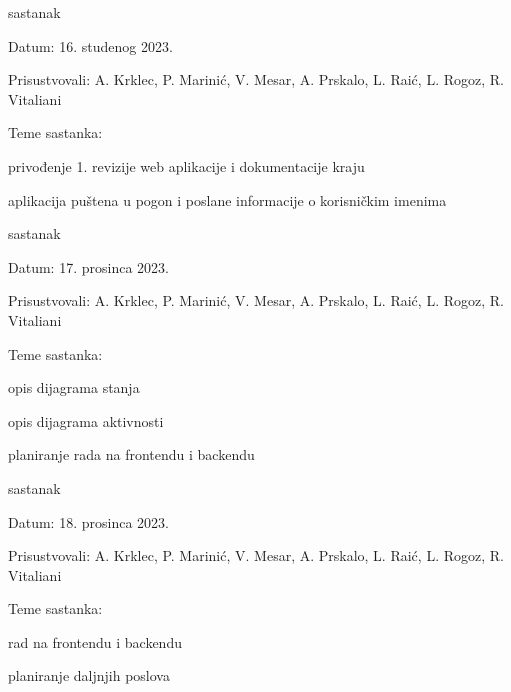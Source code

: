 \begin{packed_enum}
	\item  sastanak
	\item[] \begin{packed_item}
		\item Datum: 16. studenog 2023.
		\item Prisustvovali: A. Krklec, P. Marinić, V. Mesar, A. Prskalo, L. Raić, L. Rogoz, R. Vitaliani
		\item Teme sastanka:
		\begin{packed_item}
			\item privođenje 1. revizije web aplikacije i dokumentacije kraju
			\item aplikacija puštena u pogon i poslane informacije o korisničkim imenima
		\end{packed_item}
	\end{packed_item}

	\item  sastanak
	\item[] \begin{packed_item}
		\item Datum: 17. prosinca 2023.
		\item Prisustvovali: A. Krklec, P. Marinić, V. Mesar, A. Prskalo, L. Raić, L. Rogoz, R. Vitaliani
		\item Teme sastanka:
		\begin{packed_item}
			\item opis dijagrama stanja
			\item opis dijagrama aktivnosti
			\item planiranje rada na frontendu i backendu
		\end{packed_item}
	\end{packed_item}

	\item  sastanak
	\item[] \begin{packed_item}
		\item Datum: 18. prosinca 2023.
		\item Prisustvovali: A. Krklec, P. Marinić, V. Mesar, A. Prskalo, L. Raić, L. Rogoz, R. Vitaliani
		\item Teme sastanka:
		\begin{packed_item}
			\item rad na frontendu i backendu
			\item planiranje daljnjih poslova
		\end{packed_item}
	\end{packed_item}


\end{packed_enum}
